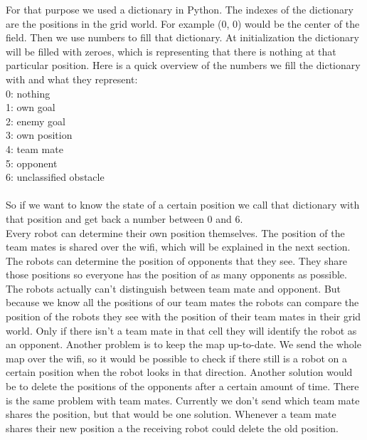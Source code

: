 \documentclass[lnicst,a4paper]{svmultln}
\begin{document}
For that purpose we used a dictionary in Python. The indexes of the dictionary are the positions in the grid world. For example (0, 0) would be the center of the field. Then we use numbers to fill that dictionary. At initialization the dictionary will be filled with zeroes, which is representing that there is nothing at that particular position. Here is a quick overview of the numbers we fill the dictionary with and what they represent:\\
0: nothing\\
1: own goal\\
2: enemy goal\\
3: own position\\
4: team mate\\
5: opponent\\
6: unclassified obstacle\\
\\
So if we want to know the state of a certain position we call that dictionary with that position and get back a number between 0 and 6.\\
Every robot can determine their own position themselves. The position of the team mates is shared over the wifi, which will be explained in the next section. The robots can determine the position of opponents that they see. They share those positions so everyone has the position of as many opponents as possible. The robots actually can't distinguish between team mate and opponent. But because we know all the positions of our team mates the robots can compare the position of the robots they see with the position of their team mates in their grid world. Only if there isn't a team mate in that cell they will identify the robot as an opponent. Another problem is to keep the map up-to-date. We send the whole map over the wifi, so it would be possible to check if there still is a robot on a certain position when the robot looks in that direction. Another solution would be to delete the positions of the opponents after a certain amount of time. There is the same problem with team mates. Currently we don't send which team mate shares the position, but that would be one solution. Whenever a team mate shares their new position a the receiving robot could delete the old position.\\




\end{document}
